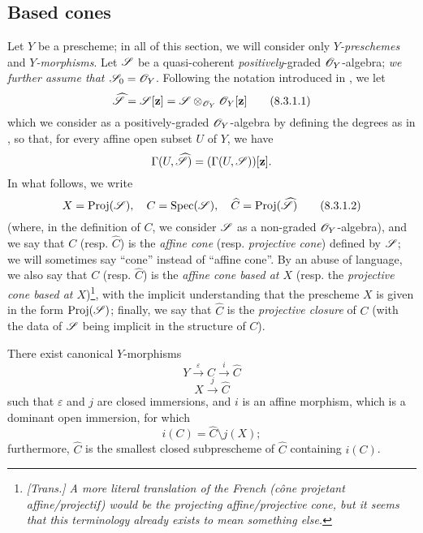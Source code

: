 \subsection{Based cones}
\label{subsection:2.8.3}

\begin{env}[8.3.1]
\label{2.8.3.1}
Let $Y$ be a prescheme;
in all of this section, we will consider only \emph{$Y$-preschemes} and \emph{$Y$-morphisms}.
Let $\mathscr{S}$ be a quasi-coherent \emph{positively}-graded $\mathscr{O}_Y$-algebra;
\emph{we further assume that $\mathscr{S}_0=\mathscr{O}_Y$}.
Following the notation introduced in , we let
\[
\label{eq:2.8.3.1.1}
  \widehat{\mathscr{S}} = \mathscr{S}[\mathbf{z}] = \mathscr{S} \otimes_{\mathscr{O}_Y} \mathscr{O}_Y[\mathbf{z}]
\tag{8.3.1.1}
\]
which we consider as a positively-graded $\mathscr{O}_Y$-algebra by defining the degrees as in , so that, for every affine open subset $U$ of $Y$, we have
\[
  \Gamma(U,\widehat{\mathscr{S}}) = (\Gamma(U,\mathscr{S}))[\mathbf{z}].
\]
In what follows, we write
\[
\label{eq:2.8.3.1.2}
  X = \operatorname{Proj}(\mathscr{S}),
  \quad
  C = \operatorname{Spec}(\mathscr{S}),
  \quad
  \widehat{C} = \operatorname{Proj}(\widehat{\mathscr{S}})
\tag{8.3.1.2}
\]
(where, in the definition of $C$, we consider $\mathscr{S}$ as a non-graded $\mathscr{O}_Y$-algebra), and we say that $C$ (resp. $\widehat{C}$) is the \emph{affine cone} (resp. \emph{projective cone}) defined by $\mathscr{S}$;
we will sometimes say ``cone'' instead of ``affine cone''.
By an abuse of language, we also say that $C$ (resp. $\widehat{C}$) is the \emph{affine cone based at $X$} (resp. the \emph{projective cone based at $X$})\footnote{\emph{[Trans.] A more literal translation of the French (\emph{cône projetant affine/projectif}) would be the \emph{projecting affine/projective cone}, but it seems that this terminology already exists to mean something else.}}, with the implicit understanding that the prescheme $X$ is given in the form $\operatorname{Proj}(\mathscr{S})$;
finally, we say that $\widehat{C}$ is the \emph{projective closure} of $C$ (with the data of $\mathscr{S}$ being implicit in the structure of $C$).
\end{env}

\begin{proposition}[8.3.2]
\label{2.8.3.2}
There exist canonical $Y$-morphisms
\[
\label{eq:2.8.3.2.1}
  Y \xrightarrow{\varepsilon} C \xrightarrow{i} \widehat{C}
\tag{8.3.2.1}
\]
\[
\label{eq:2.8.3.2.2}
  X \xrightarrow{j} \widehat{C}
\tag{8.3.2.2}
\]
such that $\varepsilon$ and $j$ are closed immersions, and $i$ is an affine morphism, which is a dominant open immersion, for which
\[
\label{eq:2.8.3.2.3}
  i(C) = \widehat{C}\setminus j(X);
\tag{8.3.2.3}
\]
furthermore, $\widehat{C}$ is the smallest closed subprescheme of $\widehat{C}$ containing $i(C)$.
\end{proposition}

